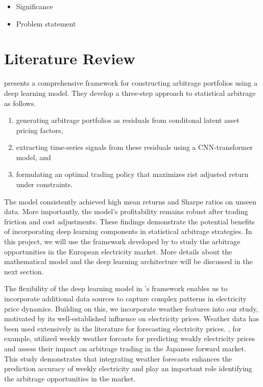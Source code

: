 \documentclass[12pt]{article}
\begin{document}
\begin{itemize}
\item Significance
\item Problem statement
\end{itemize}


\clearpage




\section{Literature Review}

\citet{guijarro2021deep} presents a comprehensive framework for constructing arbitrage portfolios using a deep learning model. They develop a three-step approach to statistical arbitrage as follows.
\begin{enumerate}[label=\arabic*)]  \itemsep5pt \parskip0pt
    \item generating arbitrage portfolios as residuals from conditonal latent asset pricing factors,
    \item extracting time-series signals from  these residuals using a CNN-transformer model, and 
    \item formulating an optimal trading policy that maximizes rist adjusted return under constraints.
\end{enumerate}
The model consistently achieved high mean returns and Sharpe ratios on unseen data. More importantly, the model's profitability remains robust after trading friction and cost adjustments. These findings demonstrate the potential benefits of incorporating deep learning components in statistical arbitrage strategies. In this project, we will use the framework developed by \citet{guijarro2021deep} to study the arbitrage opportunities in the European electricity market. More details about the mathematical model and the deep learning architecture will be discussed in the next section.

The flexibility of the deep learning model in \citet{guijarro2021deep}'s framework enables us to incorporate additional data sources to capture complex patterns in electricity price dynamics. Building on this, we incorporate weather features into our study, motivated by its well-established influence on electricity prices. Weather data has been used extensively in the literature for forecasting electricity prices. \citet{9383387}, for example, utilized weekly weather forcasts for predicting weakly electricity prices and assess their impact on arbitrage trading in the Japanese forward market. This study demonstrates that integrating weather forecasts enhances the prediction accuracy of weekly electricity and play an important role identifying the arbitrage opportunities in the market.
\end{document}
